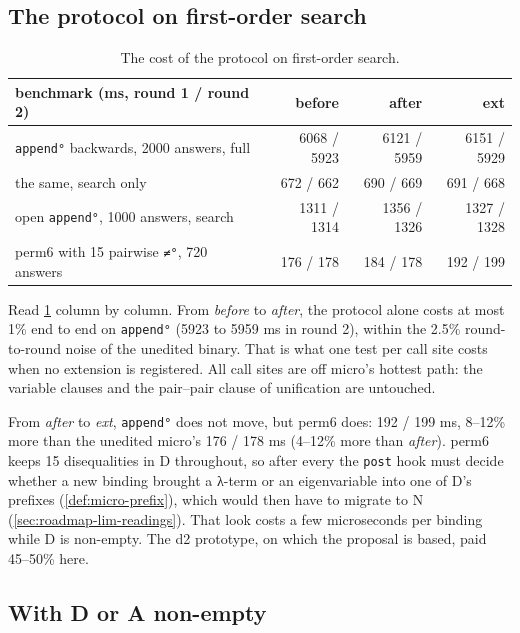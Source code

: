 \subsection{The protocol on first-order search}\label{sec:roadmap-perf-protocol}

\begin{table}[h]
\centering\small
\caption{The cost of the protocol on first-order search.}\label{tab:roadmap-perf-protocol}
\begin{tabular}{@{}lrrr@{}}
\toprule
benchmark (ms, round 1 / round 2) & before & after & ext \\
\midrule
\texttt{append°} backwards, 2000 answers, full & 6068 / 5923 & 6121 / 5959 & 6151 / 5929 \\
the same, search only & 672 / 662 & 690 / 669 & 691 / 668 \\
open \texttt{append°}, 1000 answers, search & 1311 / 1314 & 1356 / 1326 & 1327 / 1328 \\
perm6 with 15 pairwise \texttt{≠°}, 720 answers & 176 / 178 & 184 / 178 & 192 / 199 \\
\bottomrule
\end{tabular}
\end{table}

Read \cref{tab:roadmap-perf-protocol} column by column. From \emph{before} to \emph{after}, the protocol
alone costs at most 1\% end to end on \texttt{append°} (5923 to 5959 ms in round 2), within the 2.5\%
round-to-round noise of the unedited binary. That is what one  test per call site costs when
no extension is registered. All call sites are off micro's hottest path: the variable clauses and the
pair--pair clause of unification are untouched.

From \emph{after} to \emph{ext}, \texttt{append°} does not move, but perm6 does: 192 / 199 ms, 8--12\% more
than the unedited micro's 176 / 178 ms (4--12\% more than \emph{after}). perm6 keeps
15 disequalities in D throughout, so after every  the \texttt{post} hook must decide whether a
new binding brought a λ-term or an eigenvariable into one of D's prefixes (\cref{def:micro-prefix}),
which would then have to migrate to N (\cref{sec:roadmap-lim-readings}). That look costs a few microseconds per binding while D is non-empty.
The d2 prototype, on which the proposal is based, paid 45--50\% here.

\subsection{With D or A non-empty}\label{sec:roadmap-perf-DA}


